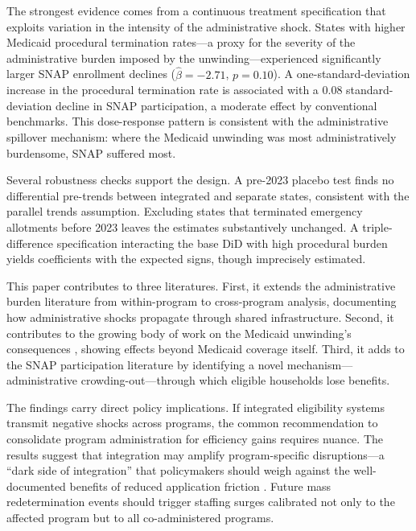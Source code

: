 \documentclass[12pt]{article}
\begin{document}
The strongest evidence comes from a continuous treatment specification that exploits variation in the intensity of the administrative shock. States with higher Medicaid procedural termination rates---a proxy for the severity of the administrative burden imposed by the unwinding---experienced significantly larger SNAP enrollment declines ($\hat{\beta} = -2.71$, $p = 0.10$). A one-standard-deviation increase in the procedural termination rate is associated with a 0.08 standard-deviation decline in SNAP participation, a moderate effect by conventional benchmarks. This dose-response pattern is consistent with the administrative spillover mechanism: where the Medicaid unwinding was most administratively burdensome, SNAP suffered most.

Several robustness checks support the design. A pre-2023 placebo test finds no differential pre-trends between integrated and separate states, consistent with the parallel trends assumption. Excluding states that terminated emergency allotments before 2023 leaves the estimates substantively unchanged. A triple-difference specification interacting the base DiD with high procedural burden yields coefficients with the expected signs, though imprecisely estimated.

This paper contributes to three literatures. First, it extends the administrative burden literature \citep{herd2015, moynihan2014, deshpande2019} from within-program to cross-program analysis, documenting how administrative shocks propagate through shared infrastructure. Second, it contributes to the growing body of work on the Medicaid unwinding's consequences \citep{kff2023unwinding, cbpp2023unwinding, sommers2017}, showing effects beyond Medicaid coverage itself. Third, it adds to the SNAP participation literature \citep{finkelstein2019, hoynes2016, ziliak2016} by identifying a novel mechanism---administrative crowding-out---through which eligible households lose benefits.

The findings carry direct policy implications. If integrated eligibility systems transmit negative shocks across programs, the common recommendation to consolidate program administration for efficiency gains requires nuance. The results suggest that integration may amplify program-specific disruptions---a ``dark side of integration'' that policymakers should weigh against the well-documented benefits of reduced application friction \citep{kleven2020}. Future mass redetermination events should trigger staffing surges calibrated not only to the affected program but to all co-administered programs.
\end{document}
